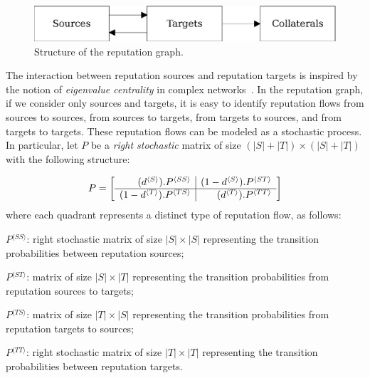 \documentclass[notitlepage]{svjour3}
\begin{document}
\begin{figure}[h]
   \centerline{\includegraphics[scale=0.6]{overview-line}}
   \caption{Structure of the reputation graph.}
   \label{fig:overview}
\end{figure}

The interaction between reputation sources and reputation targets is inspired by the 
notion of {\em eigenvalue centrality} in complex 
networks~\cite{Brin1998,Langville2008,Langville2008,Newman2010}. 
In the reputation graph, if we consider only sources and targets, it is easy to 
identify reputation flows from sources to sources, from sources to targets, from 
targets to sources, and from targets to targets. These reputation flows can be 
modeled as a stochastic process. 
In particular, let $P$ be a \emph{right stochastic} %
matrix of size $(|S|+|T|) \times (|S|+|T|)$ with the following structure: 

\newcommand{\bkt}[1]{ {^{\langle #1 \rangle}} }

\begin{align}\label{eq:newp}
P =
\left[
\begin{array}{r | r}
(d\bkt{S}) . P\bkt{SS}  & (1-d\bkt{S}) . P\bkt{ST} \\
\hline
(1-d\bkt{T}) . P\bkt{TS}  & (d\bkt{T}) . P\bkt{TT} \\
\end{array}
\right]
\end{align}
\noindent where each quadrant represents a distinct type of reputation flow, as follows: 

\begin{description}
\item $P\bkt{SS}$: right stochastic matrix of size $|S|\times |S|$ representing the 
transition probabilities between reputation sources;
\item $P\bkt{ST}$: matrix of size $|S|\times |T|$ representing the transition probabilities from reputation sources to targets;
\item $P\bkt{TS}$: matrix of size $|T|\times |S|$ representing the transition probabilities from reputation targets to sources;
\item $P\bkt{TT}$: right stochastic matrix of size $|T|\times |T|$ representing the transition probabilities between reputation targets.
\end{description}
\end{document}
